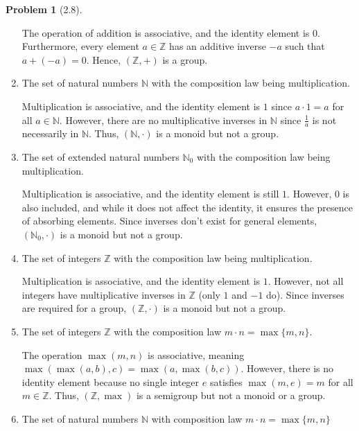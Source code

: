 \documentclass[12pt]{article}
\theoremstyle{definition}
\newtheorem{problem}{Problem}
\begin{document}
\begin{problem}[2.8]
\begin{enumerate}[label=(\alph*)]
        \begin{solution}
            The operation of addition is associative, and the identity element is $0$. Furthermore, every element $a \in \mathbb{Z}$ has an additive inverse $-a$ such that $a + (-a) = 0$. Hence, $(\mathbb{Z}, +)$ is a group.
        \end{solution}
        \item The set of natural numbers $\mathbb{N}$ with the composition law being multiplication.
        
        \begin{solution}
            Multiplication is associative, and the identity element is $1$ since $a \cdot 1 = a$ for all $a \in \mathbb{N}$. However, there are no multiplicative inverses in $\mathbb{N}$ since $\frac{1}{a}$ is not necessarily in $\mathbb{N}$. Thus, $(\mathbb{N}, \cdot)$ is a monoid but not a group.
        \end{solution}
        \item The set of extended natural numbers $\mathbb{N}_0$ with the composition law being multiplication.
        
        \begin{solution}
            Multiplication is associative, and the identity element is still $1$. However, $0$ is also included, and while it does not affect the identity, it ensures the presence of absorbing elements. Since inverses don't exist for general elements, $(\mathbb{N}_0, \cdot)$ is a monoid but not a group.
        \end{solution}
        \item The set of integers $\mathbb{Z}$ with the composition law being multiplication.
        
        \begin{solution}
            Multiplication is associative, and the identity element is $1$. However, not all integers have multiplicative inverses in $\mathbb{Z}$ (only $1$ and $-1$ do). Since inverses are required for a group, $(\mathbb{Z}, \cdot)$ is a monoid but not a group.
        \end{solution}
        \item The set of integers $\mathbb{Z}$ with the composition law $m \cdot n = \max\{m, n\}$.
        
        \begin{solution}
            The operation $\max(m, n)$ is associative, meaning $\max(\max(a, b), c) = \max(a, \max(b, c))$. However, there is no identity element because no single integer $e$ satisfies $\max(m, e) = m$ for all $m \in \mathbb{Z}$. Thus, $(\mathbb{Z}, \max)$ is a semigroup but not a monoid or a group.
        \end{solution}
        \item The set of natural numbers $\mathbb{N}$ with composition law $m \cdot n = \max\{m, n\}$
        

\end{enumerate}
\end{problem}
\end{document}
